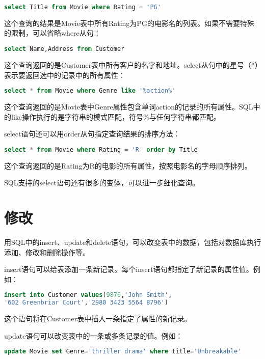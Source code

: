 \begin{lstlisting}[language=SQL]
select Title from Movie where Rating = 'PG'
\end{lstlisting}

这个查询的结果是Movie表中所有Rating为PG的电影名的列表。如果不需要特殊的限制，可以省略where从句：

\begin{lstlisting}[language=SQL]
select Name,Address from Customer
\end{lstlisting}

这个查询返回的是Customer表中所有客户的名字和地址。select从句中的星号（*）表示要返回选中的记录中的所有属性：

\begin{lstlisting}[language=SQL]
select * from Movie where Genre like '%action%'
\end{lstlisting}

这个查询返回的是Movie表中Genre属性包含单词action的记录的所有属性。SQL中的like操作执行的是字符串的模式匹配，符号\%与任何字符串都匹配。

select语句还可以用order从句指定查询结果的排序方法：

\begin{lstlisting}[language=SQL]
select * from Movie where Rating = 'R' order by Title
\end{lstlisting}

这个查询返回的是Rating为R的电影的所有属性，按照电影名的字母顺序排列。

SQL支持的select语句还有很多的变体，可以进一步细化查询。
\chapter{修改}


用SQL中的insert、update和delete语句，可以改变表中的数据，包括对数据库执行添加、修改和删除操作等。

insert语句可以给表添加一条新记录。每个insert语句都指定了新记录的属性值。例如：

\begin{lstlisting}[language=SQL]
insert into Customer values(9876,'John Smith',
'602 Greenbriar Court','2980 3423 5564 8796')
\end{lstlisting}
	
	这个语句将在Customer表中插入一条指定了属性的新记录。
	
	update语句可以改变表中的一条或多条记录的值。例如：
	
\begin{lstlisting}[language=SQL]
update Movie set Genre='thriller drama' where title='Unbreakable'
\end{lstlisting}
	
